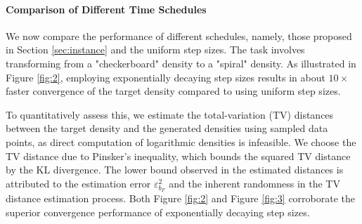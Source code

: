 

\paragraph{Comparison of Different Time Schedules} We now compare the performance of different schedules, namely, those proposed in Section \ref{sec:instance} and the uniform step sizes. The task involves transforming from a "checkerboard" density to a "spiral" density. As illustrated in Figure \ref{fig:2}, employing exponentially decaying step sizes results in about $10\times$ faster convergence of the target density compared to using uniform step sizes.  %

To quantitatively assess this, we estimate the total-variation (TV) distances between the target density and the generated densities using sampled data points, as direct computation of logarithmic densities is infeasible. We choose the TV distance due to Pinsker's inequality, which bounds the squared TV distance by the KL divergence. The lower bound observed in the estimated distances is attributed to the estimation error $\varepsilon_{b_F}^2$ and the inherent randomness in the TV distance estimation process. Both Figure \ref{fig:2} and Figure \ref{fig:3} corroborate the superior convergence performance of exponentially decaying step sizes.

